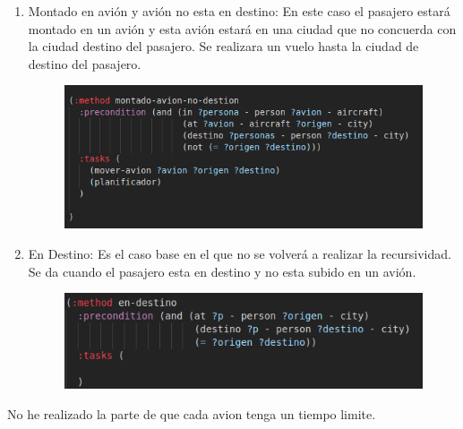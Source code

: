 \documentclass[]{article}
\begin{document}
\begin{enumerate}
	\item Montado en avión y avión no esta en destino: En este caso el pasajero estará montado en un avión y esta avión estará en una ciudad que no concuerda con la ciudad destino del pasajero. Se realizara un vuelo hasta la ciudad de destino del pasajero.
	\begin{figure}[H]
		\centering
		\includegraphics[width=0.7\linewidth]{screenshot014}
		\caption{}
		\label{fig:screenshot014}
	\end{figure}
	
	\item En Destino: Es el caso base en el que no se volverá a realizar la recursividad. Se da cuando el pasajero esta en destino y no esta subido en un avión.
	\begin{figure}[H]
		\centering
		\includegraphics[width=0.7\linewidth]{screenshot013}
		\caption{}
		\label{fig:screenshot013}
	\end{figure}
	
\end{enumerate}

No he realizado la parte de que cada avion tenga un tiempo limite.







	
\end{document}
